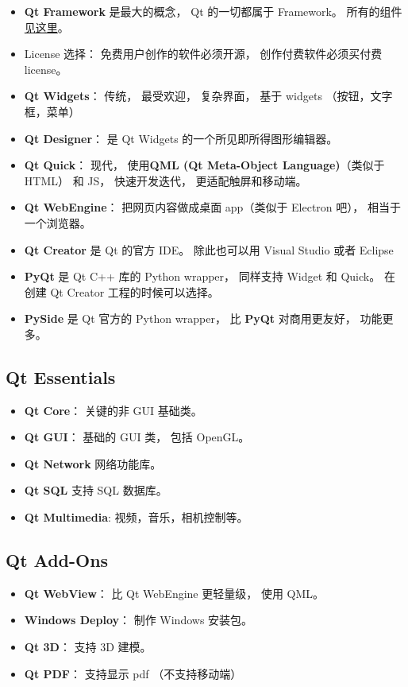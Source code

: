 
\begin{issues}
\issueDraft
\end{issues}

\begin{itemize}
\item \textbf{Qt Framework} 是最大的概念， Qt 的一切都属于 Framework。 所有的组件\href{https://doc.qt.io/qt-6/qtmodules.html}{见这里}。
\item License 选择： 免费用户创作的软件必须开源， 创作付费软件必须买付费 license。
\item \textbf{Qt Widgets}： 传统， 最受欢迎， 复杂界面， 基于 widgets （按钮，文字框，菜单）
\item \textbf{Qt Designer}： 是 Qt Widgets 的一个所见即所得图形编辑器。
\item \textbf{Qt Quick}： 现代， 使用\textbf{QML (Qt Meta-Object Language)}（类似于 HTML） 和 JS， 快速开发迭代， 更适配触屏和移动端。
\item \textbf{Qt WebEngine}： 把网页内容做成桌面 app（类似于 Electron 吧）， 相当于一个浏览器。
\item \textbf{Qt Creator} 是 Qt 的官方 IDE。 除此也可以用 Visual Studio 或者 Eclipse
\item \textbf{PyQt} 是 Qt C++ 库的 Python wrapper， 同样支持 Widget 和 Quick。 在创建 Qt Creator 工程的时候可以选择。
\item \textbf{PySide} 是 Qt 官方的 Python wrapper， 比 \textbf{PyQt} 对商用更友好， 功能更多。
\end{itemize}

\subsection{Qt Essentials}
\begin{itemize}
\item \textbf{Qt Core}： 关键的非 GUI 基础类。
\item \textbf{Qt GUI}： 基础的 GUI 类， 包括 OpenGL。
\item \textbf{Qt Network} 网络功能库。
\item \textbf{Qt SQL} 支持 SQL 数据库。
\item \textbf{Qt Multimedia}: 视频，音乐，相机控制等。
\end{itemize}

\subsection{Qt Add-Ons}
\begin{itemize}
\item \textbf{Qt WebView}： 比 Qt WebEngine 更轻量级， 使用 QML。
\item \textbf{Windows Deploy}： 制作 Windows 安装包。
\item \textbf{Qt 3D}： 支持 3D 建模。
\item \textbf{Qt PDF}： 支持显示 pdf （不支持移动端）
\end{itemize}


